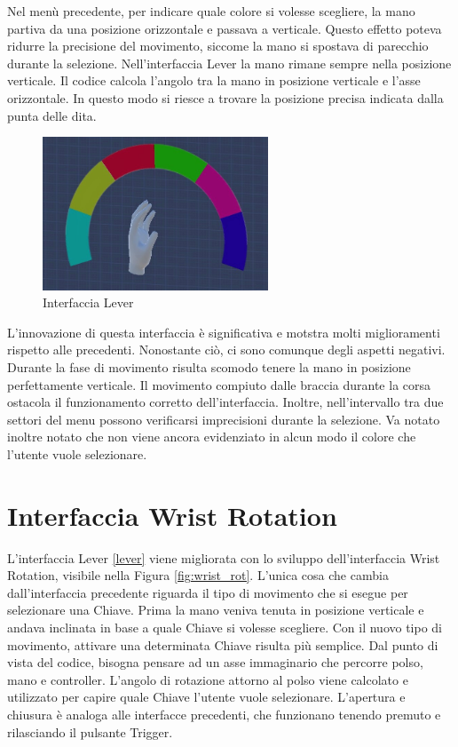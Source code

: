 \documentclass[target=bach,aauheader=]{thud}
\begin{document}
Nel menù precedente, per indicare quale colore si volesse scegliere, la mano partiva da una posizione orizzontale e passava a verticale.
Questo effetto poteva ridurre la precisione del movimento, siccome la mano si spostava di parecchio durante la selezione.
Nell'interfaccia Lever la mano rimane sempre nella posizione verticale.
Il codice calcola l'angolo tra la mano in posizione verticale e l'asse orizzontale.
In questo modo si riesce a trovare la posizione precisa indicata dalla punta delle dita.
 
\begin{figure}[h]
    \centering
    \includegraphics[width=0.60\textwidth]{lever}
    \caption{Interfaccia Lever}
    \label{fig:lever}
\end{figure}

L'innovazione di questa interfaccia è significativa e motstra molti miglioramenti rispetto alle precedenti.
Nonostante ciò, ci sono comunque degli aspetti negativi.
Durante la fase di movimento risulta scomodo tenere la mano in posizione perfettamente verticale.
Il movimento compiuto dalle braccia durante la corsa ostacola il funzionamento corretto dell'interfaccia.
Inoltre, nell'intervallo tra due settori del menu possono verificarsi imprecisioni durante la selezione.
Va notato inoltre notato che non viene ancora evidenziato in alcun modo il colore che l'utente vuole selezionare. 

\section{Interfaccia Wrist Rotation} %
\label{wrist_rot}
L'interfaccia Lever \ref{lever} viene migliorata con lo sviluppo dell'interfaccia Wrist Rotation, visibile nella Figura \ref{fig:wrist_rot}.
L'unica cosa che cambia dall'interfaccia precedente riguarda il tipo di movimento che si esegue per selezionare una Chiave.
Prima la mano veniva tenuta in posizione verticale e andava inclinata in base a quale Chiave si volesse scegliere.
Con il nuovo tipo di movimento, attivare una determinata Chiave risulta più semplice.
Dal punto di vista del codice, bisogna pensare ad un asse immaginario che percorre polso, mano e controller.
L'angolo di rotazione attorno al polso viene calcolato e utilizzato per capire quale Chiave l'utente vuole selezionare.
L'apertura e chiusura è analoga alle interfacce precedenti, che funzionano tenendo premuto e rilasciando il pulsante Trigger. \\
\end{document}

